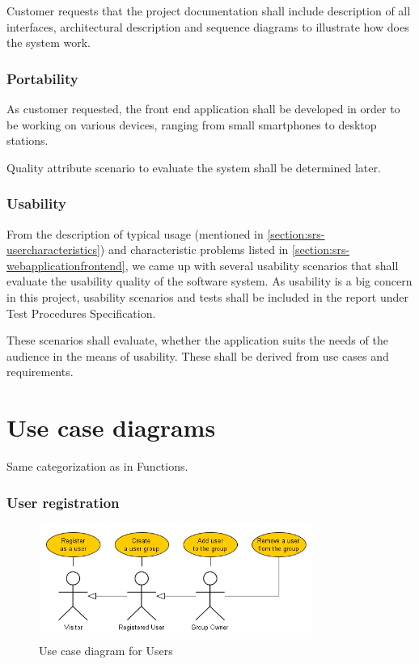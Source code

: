 \documentclass[11pt]{book}
\begin{document}
Customer requests that the project documentation shall include description of all interfaces, architectural description and sequence diagrams to illustrate how does the system work.

\subsubsection{Portability}
As customer requested, the front end application shall be developed in order to be working on various devices, ranging from small smartphones to desktop stations.

Quality attribute scenario to evaluate the system shall be determined later.

\subsubsection{Usability}\label{section:usability}
From the description of typical usage (mentioned in \ref{section:srs-usercharacteristics}) and characteristic problems listed in \ref{section:srs-webapplicationfrontend}, we came up with several usability scenarios that shall evaluate the usability quality of the software system. As usability is a big concern in this project, usability scenarios and tests shall be included in the report under Test Procedures Specification.  %

These scenarios shall evaluate, whether the application suits the needs of the audience in the means of usability. These shall be derived from use cases and requirements.

\section{Use case diagrams}
Same categorization as in Functions. 

\subsubsection{User registration}
\begin{figure}[H]
      \centering
      \includegraphics[width=0.8\textwidth]{Figures/Requirements/users.png} %
      \caption{Use case diagram for Users}
      \label{fig:req_usecase_users}
\end{figure}
\end{document}

